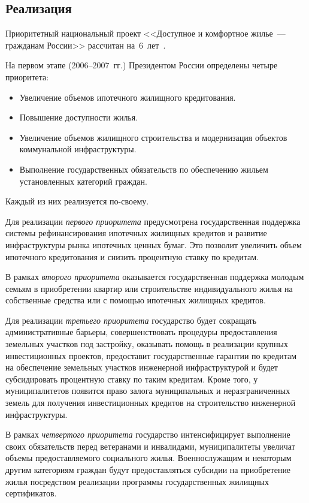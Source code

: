 \documentclass[article, 12pt, russian, oneside]{ncc}
\begin{document}
\subsection{Реализация}

Приоритетный национальный проект <<Доступное и комфортное жилье~---
гражданам России>> рассчитан на~6~лет~\cite{Hub_Goals}.

На первом этапе (2006--2007~гг.) Президентом России определены четыре
приоритета:

\begin{itemize}
\item Увеличение объемов ипотечного жилищного кредитования.
\item Повышение доступности жилья.
\item Увеличение объемов жилищного строительства и модернизация
  объектов коммунальной инфраструктуры.
\item Выполнение государственных обязательств по обеспечению жильем
  установленных категорий граждан.
\end{itemize}

Каждый из них реализуется по-своему.

Для реализации \emph{первого приоритета} предусмотрена государственная
поддержка системы рефинансирования ипотечных жилищных кредитов и
развитие инфраструктуры рынка ипотечных ценных бумаг. Это позволит
увеличить объем ипотечного кредитования и снизить процентную ставку по
кредитам.

В рамках \emph{второго приоритета} оказывается государственная
поддержка молодым семьям в приобретении квартир или строительстве
индивидуального жилья на собственные средства или с помощью ипотечных
жилищных кредитов.

Для реализации \emph{третьего приоритета} государство будет сокращать
административные барьеры, совершенствовать процедуры предоставления
земельных участков под застройку, оказывать помощь в реализации
крупных инвестиционных проектов, предоставит государственные гарантии
по кредитам на обеспечение земельных участков инженерной
инфраструктурой и будет субсидировать процентную ставку по таким
кредитам. Кроме того, у муниципалитетов появится право залога
муниципальных и неразграниченных земель для получения инвестиционных
кредитов на строительство инженерной инфраструктуры.

В рамках \emph{четвертого приоритета} государство интенсифицирует
выполнение своих обязательств перед ветеранами и инвалидами,
муниципалитеты увеличат объемы предоставляемого социального
жилья. Военнослужащим и некоторым другим категориям граждан будут
предоставляться субсидии на приобретение жилья посредством реализации
программы государственных жилищных сертификатов.
\end{document}
